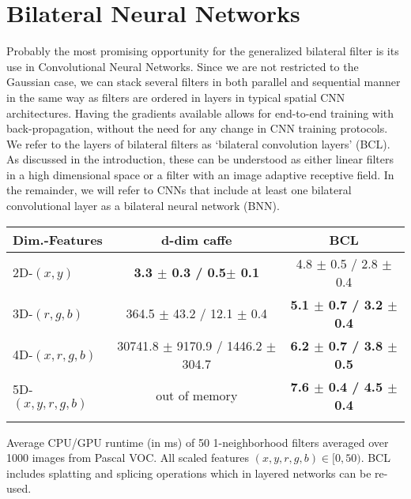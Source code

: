 \section{Bilateral Neural Networks}\label{sec:bnn}

Probably the most promising opportunity for the generalized bilateral filter is its
use in Convolutional Neural Networks. Since we are not restricted to the Gaussian case,
we can stack several filters in both parallel and sequential manner in the same way as filters are ordered in
layers in typical spatial CNN architectures. Having the gradients available allows for end-to-end training
with back-propagation, without the need for any change in CNN training protocols. We refer to the
layers of bilateral filters as `bilateral convolution layers' (BCL). As discussed in the introduction,
these can be understood as either linear filters in a high dimensional space or a filter with an
image adaptive receptive field. In the remainder, we will refer to CNNs that include at least one bilateral
convolutional layer as a bilateral neural network (BNN).

\setlength{\tabcolsep}{4pt}
\begin{table}[h]
  \scriptsize
  \centering
    \begin{tabular}{l c c}
      \toprule
\textbf{Dim.-Features} & \textbf{d-dim caffe} & \textbf{BCL} \\ [0.1cm]
      \midrule
      2D-$(x, y)$ & \textbf{3.3 $\pm$ 0.3 / 0.5$ \pm$ 0.1} & 4.8 $\pm$ 0.5 / 2.8 $\pm$ 0.4  \\
      3D-$(r,g,b)$ & 364.5 $\pm$ 43.2 / 12.1 $\pm$ 0.4 & \textbf{5.1 $\pm$ 0.7 / 3.2 $\pm$ 0.4}  \\
      4D-$(x,r,g,b)$ & 30741.8 $\pm$ 9170.9 / 1446.2 $\pm$ 304.7 & \textbf{6.2 $\pm$ 0.7 / 3.8 $\pm$ 0.5}  \\
      5D-$(x,y,r,g,b)$ & out of memory & \textbf{7.6 $\pm$ 0.4 / 4.5 $\pm$ 0.4}  \\
      \\
    \end{tabular}
     {Average CPU/GPU runtime (in ms)
    of 50 1-neighborhood filters averaged over 1000 images from Pascal VOC. All scaled
    features $(x,y,r,g,b)\in[0,50)$. BCL includes splatting and splicing operations which in layered networks
    can be re-used.}
\label{tbl:time}
\end{table}

